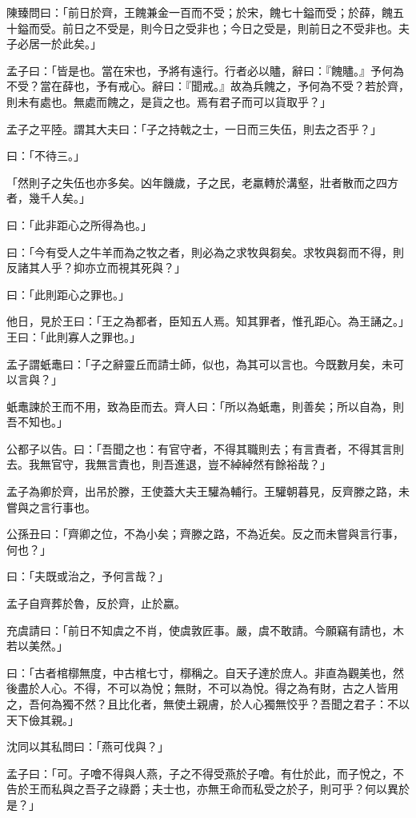 \documentclass[12pt,a4paper]{ctexbook}
\begin{document}
陳臻問曰：「前日於齊，王餽兼金一百而不受；於宋，餽七十鎰而受；於薛，餽五十鎰而受。前日之不受是，則今日之受非也；今日之受是，則前日之不受非也。夫子必居一於此矣。」\par
孟子曰：「皆是也。當在宋也，予將有遠行。行者必以贐，辭曰：『餽贐。』予何為不受？當在薛也，予有戒心。辭曰：『聞戒。』故為兵餽之，予何為不受？若於齊，則未有處也。無處而餽之，是貨之也。焉有君子而可以貨取乎？」\par
孟子之平陸。謂其大夫曰：「子之持戟之士，一日而三失伍，則去之否乎？」\par
曰：「不待三。」\par
「然則子之失伍也亦多矣。凶年饑歲，子之民，老羸轉於溝壑，壯者散而之四方者，幾千人矣。」\par
曰：「此非距心之所得為也。」\par
曰：「今有受人之牛羊而為之牧之者，則必為之求牧與芻矣。求牧與芻而不得，則反諸其人乎？抑亦立而視其死與？」\par
曰：「此則距心之罪也。」\par
他日，見於王曰：「王之為都者，臣知五人焉。知其罪者，惟孔距心。為王誦之。」王曰：「此則寡人之罪也。」\par
孟子謂蚔鼃曰：「子之辭靈丘而請士師，似也，為其可以言也。今既數月矣，未可以言與？」\par
蚔鼃諫於王而不用，致為臣而去。齊人曰：「所以為蚔鼃，則善矣；所以自為，則吾不知也。」\par
公都子以告。曰：「吾聞之也：有官守者，不得其職則去；有言責者，不得其言則去。我無官守，我無言責也，則吾進退，豈不綽綽然有餘裕哉？」\par
孟子為卿於齊，出吊於滕，王使蓋大夫王驩為輔行。王驩朝暮見，反齊滕之路，未嘗與之言行事也。\par
公孫丑曰：「齊卿之位，不為小矣；齊滕之路，不為近矣。反之而未嘗與言行事，何也？」\par
曰：「夫既或治之，予何言哉？」\par
孟子自齊葬於魯，反於齊，止於嬴。\par
充虞請曰：「前日不知虞之不肖，使虞敦匠事。嚴，虞不敢請。今願竊有請也，木若以美然。」\par
曰：「古者棺槨無度，中古棺七寸，槨稱之。自天子達於庶人。非直為觀美也，然後盡於人心。不得，不可以為悅；無財，不可以為悅。得之為有財，古之人皆用之，吾何為獨不然？且比化者，無使土親膚，於人心獨無恔乎？吾聞之君子：不以天下儉其親。」\par
沈同以其私問曰：「燕可伐與？」\par
孟子曰：「可。子噲不得與人燕，子之不得受燕於子噲。有仕於此，而子悅之，不告於王而私與之吾子之祿爵；夫士也，亦無王命而私受之於子，則可乎？何以異於是？」\par
\end{document}
